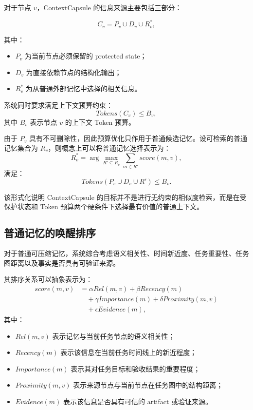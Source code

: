 \documentclass[UTF8,a4paper,12pt,oneside]{ctexbook}
\begin{document}
对于节点 $v$，ContextCapsule 的信息来源主要包括三部分：

\[
C_v
=
P_v
\cup
D_v
\cup
R_v^{*},
\]

其中：

\begin{itemize}
    \item $P_v$ 为当前节点必须保留的 protected state；
    \item $D_v$ 为直接依赖节点的结构化输出；
    \item $R_v^{*}$ 为从普通外部记忆中选择的相关信息。
\end{itemize}

系统同时要求满足上下文预算约束：
\[
Tokens(C_v)\le B_v,
\]
其中 $B_v$ 表示节点 $v$ 的上下文 Token 预算。

由于 $P_v$ 具有不可删除性，因此预算优化只作用于普通候选记忆。设可检索的普通记忆集合为 $R_v$，则概念上可以将普通记忆选择表示为：
\[
R_v^{*}
=
\arg\max_{R'\subseteq R_v}
\sum_{m\in R'}score(m,v),
\]
满足：
\[
Tokens(P_v\cup D_v\cup R')\le B_v.
\]

该形式化说明 ContextCapsule 的目标并不是进行无约束的相似度检索，而是在受保护状态和 Token 预算两个硬条件下选择最有价值的普通上下文。


\subsection{普通记忆的唤醒排序}

对于普通可压缩记忆，系统综合考虑语义相关性、时间新近度、任务重要性、任务图距离以及事实是否具有可验证来源。

其排序关系可以抽象表示为：
\[
\begin{aligned}
score(m,v)
&= \alpha Rel(m,v) + \beta Recency(m) \\[3pt]
&\quad + \gamma Importance(m) + \delta Proximity(m,v) \\[3pt]
&\quad + \epsilon Evidence(m),
\end{aligned}
\]
其中：

\begin{itemize}
    \item $Rel(m,v)$ 表示记忆与当前任务节点的语义相关性；
    \item $Recency(m)$ 表示该信息在当前任务时间线上的新近程度；
    \item $Importance(m)$ 表示其对任务目标和验收结果的重要程度；
    \item $Proximity(m,v)$ 表示来源节点与当前节点在任务图中的结构距离；
    \item $Evidence(m)$ 表示该信息是否具有可信的 artifact 或验证来源。
\end{itemize}
\end{document}
